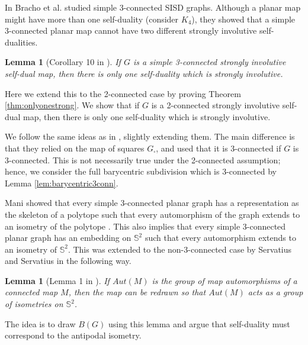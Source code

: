 \documentclass[10pt,a4paper]{article}
\newtheorem{lemma}[theorem]{Lemma}
\newcommand{\Sb}[0]{\mathbb{S}}
\begin{document}
In \cite{bracho2020strongly} Bracho et al. studied simple 3-connected SISD graphs. Although a planar map might have more than one self-duality (consider $K_4$), they showed that a simple 3-connected planar map cannot have two different strongly involutive self-dualities. 


\begin{lemma}[Corollary 10 in \cite{bracho2020strongly}]\label{lem:dualityunique}
    If $G$ is a simple 3-connected strongly involutive self-dual map, then there is only one self-duality which is strongly involutive.
\end{lemma}

Here we extend this to the 2-connected case by proving Theorem \ref{thm:onlyonestrong}. We show that if $G$ is a 2-connected strongly involutive self-dual map, then there is only one self-duality which is strongly involutive.     

 We follow the same ideas as in \cite{bracho2020strongly}, slightly extending them. The main difference is that they relied on the map of squares $G_\square$, and used that it is 3-connected if $G$ is 3-connected. This is not necessarily true under the 2-connected assumption; hence,  we consider the full barycentric subdivision which is 3-connected by Lemma \ref{lem:barycentric3conn}. 
 
 Mani showed that every simple 3-connected planar graph has a representation as the skeleton of a polytope such that every automorphism of the graph extends to an isometry of the polytope \cite{Mani1971}. This also implies that every simple 3-connected planar graph has an embedding on $\Sb^2$ such that every automorphism extends to an isometry of $\Sb^2$. This was extended to the non-3-connected case by Servatius and Servatius in the following way.

\begin{lemma}[Lemma 1 in \cite{ServatiusServatius1995}]\label{lem:straight}
If $Aut(M)$ is the group of map automorphisms
of a connected map $M$, then the map can be redrawn so that $Aut(M)$ acts as a group of isometries on $\Sb^2$.
\end{lemma}

The idea is to draw $B(G)$ using this lemma and argue that self-duality must correspond to the antipodal isometry. 
\end{document}
